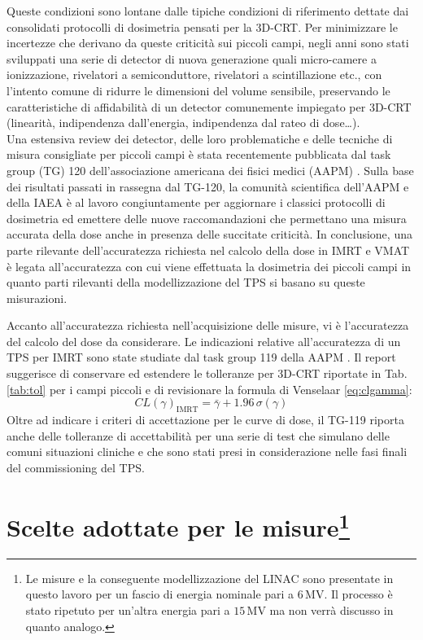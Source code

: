 Queste condizioni sono lontane dalle tipiche condizioni di riferimento dettate dai consolidati protocolli di dosimetria \cite{Almond1999,Andreo2006} pensati per la 3D-CRT. Per minimizzare le incertezze che derivano da queste criticità sui piccoli campi, negli anni sono stati sviluppati una serie di detector di nuova generazione quali micro-camere a ionizzazione, rivelatori a semiconduttore, rivelatori a scintillazione etc., con l'intento comune di ridurre le dimensioni del volume sensibile, preservando le caratteristiche di affidabilità di un detector comunemente impiegato per 3D-CRT (linearità, indipendenza dall'energia, indipendenza dal rateo di dose\ldots).\\
Una estensiva review dei detector, delle loro problematiche e delle tecniche di misura consigliate per piccoli campi è stata recentemente pubblicata dal task group (TG) 120 dell'associazione americana dei fisici medici (AAPM) \cite{Low2011}. Sulla base dei risultati passati in rassegna dal TG-120, la comunità scientifica dell'AAPM e della IAEA è al lavoro congiuntamente per aggiornare i classici protocolli di dosimetria ed emettere delle nuove raccomandazioni che permettano una misura accurata della dose anche in presenza delle succitate criticità. In conclusione, una parte rilevante dell'accuratezza richiesta nel calcolo della dose in IMRT e VMAT è legata all'accuratezza con cui viene effettuata la dosimetria dei piccoli campi in quanto parti rilevanti della modellizzazione del TPS si basano su queste misurazioni.

Accanto all'accuratezza richiesta nell'acquisizione delle misure, vi è l'accuratezza del calcolo del dose da considerare. Le indicazioni relative all'accuratezza di un TPS per IMRT sono state studiate dal task group 119 della AAPM \cite{Ezzell2009}. Il report suggerisce di conservare ed estendere le tolleranze per 3D-CRT riportate in Tab.\ref{tab:tol} per i campi piccoli e di revisionare la formula di Venselaar \eqref{eq:clgamma}:
\begin{equation}
CL(\gamma)_{\text{IMRT}} = \bar{\gamma} + 1.96\,\sigma(\gamma)
\end{equation}
Oltre ad indicare i criteri di accettazione per le curve di dose, il TG-119 riporta anche delle tolleranze di accettabilità per una serie di test che simulano delle comuni situazioni cliniche e che sono stati presi in considerazione nelle fasi finali del commissioning del TPS. 

\section[Scelte adottate per le misure]{Scelte adottate per le misure\protect\footnote{Le misure e la conseguente modellizzazione del LINAC sono presentate in questo lavoro per un fascio di energia nominale pari a $6\,$MV. Il processo è stato ripetuto per un'altra energia pari a $15\,$MV ma non verrà discusso in quanto analogo.}}


